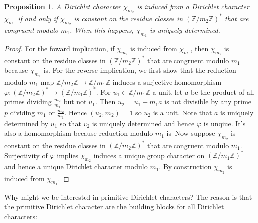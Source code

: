 \documentclass[12pt]{book}
\newtheorem{proposition}{Proposition}[section]
\theoremstyle{definition}\newframedtheorem{method}{Method}
\newcommand{\Z}{\mathbb{Z}}
\newcommand{\vphi}{\varphi}
\newcommand{\<}{\langle}
\renewcommand{\>}{\rangle}
\begin{document}
    \begin{proposition}\label{prop:Dirichlet_character_induction_classification}
      A Dirichlet character $\chi_{m_{2}}$ is induced from a Dirichlet character $\chi_{m_{1}}$ if and only if $\chi_{m_{2}}$ is constant on the residue classes in $(\Z/m_{2}\Z)^{\ast}$ that are congruent modulo $m_{1}$. When this happens, $\chi_{m_{1}}$ is uniquely determined.
    \end{proposition}
    \begin{proof}
      For the foward implication, if $\chi_{m_{2}}$ is induced from $\chi_{m_{1}}$, then $\chi_{m_{2}}$ is constant on the residue classes in $(\Z/m_{2}\Z)^{\ast}$ that are congruent modulo $m_{1}$ because $\chi_{m_{1}}$ is. For the reverse implication, we first show that the reduction modulo $m_{1}$ map $\Z/m_{2}\Z \to \Z/m_{1}\Z$ induces a surjective homomorphism $\vphi:(\Z/m_{2}\Z)^{\ast} \to (\Z/m_{1}\Z)^{\ast}$. For $u_{1} \in \Z/m_{1}\Z$ a unit, let $a$ be the product of all primes dividing $\frac{m_{2}}{m_{1}}$ but not $u_{1}$. Then $u_{2} = u_{1}+m_{1}a$ is not divisible by any prime $p$ dividing $m_{1}$ or $\frac{m_{2}}{m_{1}}$. Hence $(u_{2},m_{2}) = 1$ so $u_{2}$ is a unit. Note that $a$ is uniquely determined by $u_{1}$ so that $u_{2}$ is uniquely determined and hence $\vphi$ is unqiue. It's also a homomorphism because reduction modulo $m_{1}$ is. Now suppose $\chi_{m_{2}}$ is constant on the residue classes in $(\Z/m_{2}\Z)^{\ast}$ that are congruent modulo $m_{1}$. Surjectivity of $\vphi$ implies $\chi_{m_{2}}$ induces a unique group character on $(\Z/m_{1}\Z)^{\ast}$ and hence a unique Dirichlet character modulo $m_{1}$. By construction $\chi_{m_{2}}$ is induced from $\chi_{m_{1}}$.
    \end{proof}

    Why might we be interested in primitive Dirichlet characters? The reason is that the primitive Dirichlet character are the building blocks for all Dirichlet characters:
\end{document}

